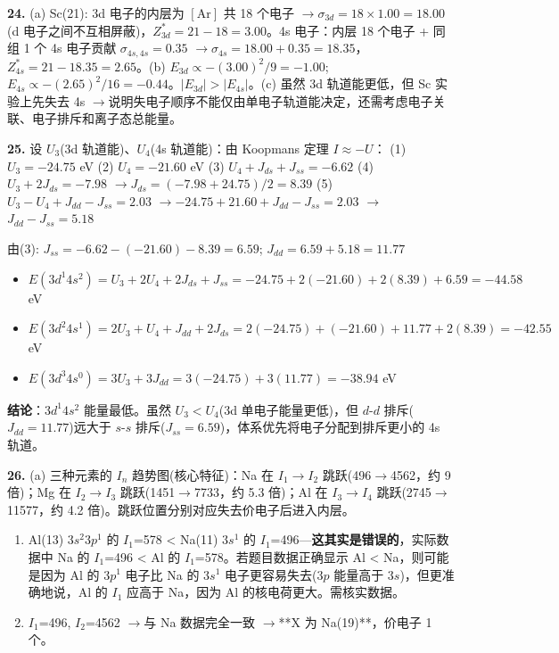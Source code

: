 \documentclass[a4paper,11pt]{ctexart}
\providecommand{\tightlist}{\setlength{\itemsep}{0pt}\setlength{\parskip}{0pt}}
\newcommand{\箭}{\ensuremath{\rightarrow}}
\newcommand{\左箭}{\ensuremath{\leftarrow}}
\newcommand{\上箭}{\ensuremath{\uparrow}}
\newcommand{\下箭}{\ensuremath{\downarrow}}
\newcommand{\衡}{\ensuremath{\rightleftharpoons}}
\newcommand{\双箭}{\ensuremath{\leftrightarrow}}
\newcommand{\约等于}{\ensuremath{\approx}}
\newcommand{\小于等于}{\ensuremath{\leq}}
\newcommand{\大于等于}{\ensuremath{\geq}}
\newcommand{\不等于}{\ensuremath{\neq}}
\newcommand{\西格马}{\ensuremath{\sigma}}
\newcommand{\派}{\ensuremath{\pi}}
\begin{document}
\textbf{24.} (a) Sc(21): 3d 电子的内层为 \([\mathrm{Ar}]\) 共 18 个电子 \箭 \(\sigma_{3d} = 18 \times 1.00 = 18.00\)(d 电子之间不互相屏蔽)，\(Z^*_{3d} = 21 - 18 = 3.00\)。4s 电子：内层 18 个电子 + 同组 1 个 4s 电子贡献 \(\sigma_{4s,4s} = 0.35\) \箭 \(\sigma_{4s} = 18.00 + 0.35 = 18.35\)，\(Z^*_{4s} = 21 - 18.35 = 2.65\)。(b) \(E_{3d} \propto -(3.00)^2/9 = -1.00\); \(E_{4s} \propto -(2.65)^2/16 = -0.44\)。\(|E_{3d}| > |E_{4s}|\)。(c) 虽然 3d 轨道能更低，但 Sc 实验上先失去 4s \箭 说明失电子顺序不能仅由单电子轨道能决定，还需考虑电子关联、电子排斥和离子态总能量。

\textbf{25.} 设 \(U_3\)(3d 轨道能)、\(U_4\)(4s 轨道能)：由 Koopmans 定理 \(I \approx -U\)：
(1) \(U_3 = -24.75\) eV
(2) \(U_4 = -21.60\) eV
(3) \(U_4 + J_{ds} + J_{ss} = -6.62\)
(4) \(U_3 + 2J_{ds} = -7.98\) \箭 \(J_{ds} = (-7.98 + 24.75)/2 = 8.39\)
(5) \(U_3 - U_4 + J_{dd} - J_{ss} = 2.03\) \箭 \(-24.75+21.60+J_{dd}-J_{ss}=2.03\) \箭 \(J_{dd}-J_{ss}=5.18\)

由(3): \(J_{ss} = -6.62 - (-21.60) - 8.39 = 6.59\); \(J_{dd} = 6.59 + 5.18 = 11.77\)

\begin{itemize}
\tightlist
\item
  \(E(3d^1 4s^2) = U_3 + 2U_4 + 2J_{ds} + J_{ss} = -24.75 + 2(-21.60) + 2(8.39) + 6.59 = -44.58\) eV
\item
  \(E(3d^2 4s^1) = 2U_3 + U_4 + J_{dd} + 2J_{ds} = 2(-24.75) + (-21.60) + 11.77 + 2(8.39) = -42.55\) eV
\item
  \(E(3d^3 4s^0) = 3U_3 + 3J_{dd} = 3(-24.75) + 3(11.77) = -38.94\) eV
\end{itemize}

\textbf{结论}：\(3d^1 4s^2\) 能量最低。虽然 \(U_3 < U_4\)(3d 单电子能量更低)，但 \(d\)-\(d\) 排斥(\(J_{dd}=11.77\))远大于 \(s\)-\(s\) 排斥(\(J_{ss}=6.59\))，体系优先将电子分配到排斥更小的 4s 轨道。

\textbf{26.} (a) 三种元素的 \(I_n\) 趋势图(核心特征)：Na 在 \(I_1\)\箭\(I_2\) 跳跃(496\箭4562，约 9 倍)；Mg 在 \(I_2\)\箭\(I_3\) 跳跃(1451\箭7733，约 5.3 倍)；Al 在 \(I_3\)\箭\(I_4\) 跳跃(2745\箭11577，约 4.2 倍)。跳跃位置分别对应失去价电子后进入内层。

\begin{enumerate}
\def\labelenumi{(\alph{enumi})}
\setcounter{enumi}{1}
\item
  Al(13) \(3s^2 3p^1\) 的 \(I_1\)=578 \textless{} Na(11) \(3s^1\) 的 \(I_1\)=496---\textbf{这其实是错误的}，实际数据中 Na 的 \(I_1\)=496 \textless{} Al 的 \(I_1\)=578。若题目数据正确显示 Al \textless{} Na，则可能是因为 Al 的 \(3p^1\) 电子比 Na 的 \(3s^1\) 电子更容易失去(\(3p\) 能量高于 \(3s\))，但更准确地说，Al 的 \(I_1\) 应高于 Na，因为 Al 的核电荷更大。需核实数据。
\item
  \(I_1\)=496, \(I_2\)=4562 \箭 与 Na 数据完全一致 \箭 **X 为 Na(19)**，价电子 1 个。
\end{enumerate}
\end{document}
